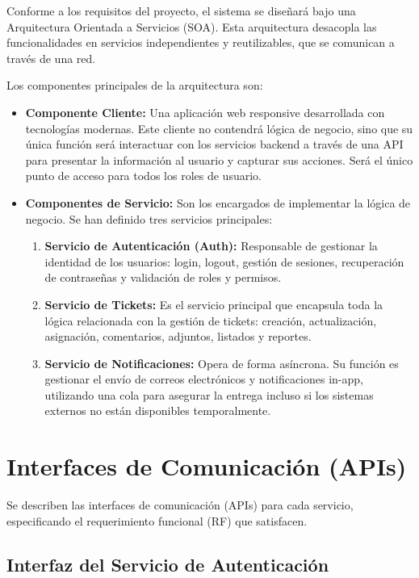 \documentclass[12pt,a4paper]{article}
\begin{document}
Conforme a los requisitos del proyecto, el sistema se diseñará bajo una Arquitectura Orientada a Servicios (SOA). Esta arquitectura desacopla las funcionalidades en servicios independientes y reutilizables, que se comunican a través de una red.

Los componentes principales de la arquitectura son:

\begin{itemize}
    \item \textbf{Componente Cliente:} Una aplicación web responsive desarrollada con tecnologías modernas. Este cliente no contendrá lógica de negocio, sino que su única función será interactuar con los servicios backend a través de una API para presentar la información al usuario y capturar sus acciones. Será el único punto de acceso para todos los roles de usuario.
    
    \item \textbf{Componentes de Servicio:} Son los encargados de implementar la lógica de negocio. Se han definido tres servicios principales:
    \begin{enumerate}
        \item \textbf{Servicio de Autenticación (Auth):} Responsable de gestionar la identidad de los usuarios: login, logout, gestión de sesiones, recuperación de contraseñas y validación de roles y permisos.
        \item \textbf{Servicio de Tickets:} Es el servicio principal que encapsula toda la lógica relacionada con la gestión de tickets: creación, actualización, asignación, comentarios, adjuntos, listados y reportes.
        \item \textbf{Servicio de Notificaciones:} Opera de forma asíncrona. Su función es gestionar el envío de correos electrónicos y notificaciones in-app, utilizando una cola para asegurar la entrega incluso si los sistemas externos no están disponibles temporalmente.
    \end{enumerate}
\end{itemize}

\section{Interfaces de Comunicación (APIs)}

Se describen las interfaces de comunicación (APIs) para cada servicio, especificando el requerimiento funcional (RF) que satisfacen.

\subsection{Interfaz del Servicio de Autenticación}
\end{document}
